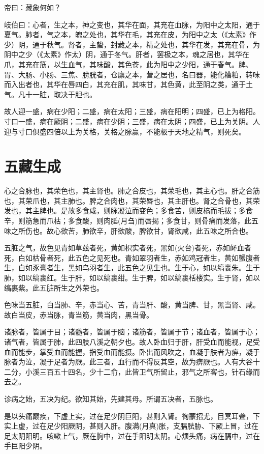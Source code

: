 \documentclass{article}%
\begin{document}
帝曰：藏象何如？

岐伯曰：心者，生之本，神之变也，其华在面，其充在血脉，为阳中之太阳，通于夏气。肺者，气之本，魄之处也，其华在毛，其充在皮，为阳中之太（《太素》作少）阴，通于秋气。肾者，主蛰，封藏之本，精之处也，其华在发，其充在骨，为阴中之少（《太素》作太）阴，通于冬气。肝者，罢极之本，魂之居也，其华在爪，其充在筋，以生血气，其味酸，其色苍，此为阳中之少阳，通于春气。脾、胃、大肠、小肠、三焦、膀胱者，仓廪之本，营之居也，名曰器，能化糟粕，转味而入出者也，其华在唇四白，其充在肌，其味甘，其色黄，此至阴之类，通于土气。凡十一脏，取决于胆也。

故人迎一盛，病在少阳；二盛，病在太阳；三盛，病在阳明；四盛，已上为格阳。寸口一盛，病在厥阴；二盛，病在少阴；三盛，病在太阴；四盛，已上为关阴。人迎与寸口俱盛四倍以上为关格，关格之脉赢，不能极于天地之精气，则死矣。
\section{五藏生成}
心之合脉也，其荣色也，其主肾也。肺之合皮也，其荣毛也，其主心也。肝之合筋也，其荣爪也，其主肺也。脾之合肉也，其荣唇也，其主肝也。肾之合骨也，其荣发也，其主脾也。是故多食咸，则脉凝泣而变色；多食苦，则皮槁而毛拔；多食辛，则筋急而爪枯；多食酸，则肉胝(月刍)而唇揭；多食甘，则骨痛而发落，此五味之所伤也。故心欲苦，肺欲辛，肝欲酸，脾欲甘，肾欲咸，此五味之所合也。

五脏之气，故色见青如草兹者死，黄如枳实者死，黑如(火台)者死，赤如衃血者死，白如枯骨者死，此五色之见死也。青如翠羽者生，赤如鸡冠者生，黄如蟹腹者生，白如豕膏者生，黑如乌羽者生，此五色之见生也。生于心，如以缟裹朱。生于肺，如以缟裹红。生于肝，如以缟裹绀。生于脾，如以缟裹栝楼实。生于肾，如以缟裹紫。此五脏所生之外荣也。

色味当五脏，白当肺、辛，赤当心、苦，青当肝、酸，黄当脾、甘，黑当肾、咸。故白当皮，赤当脉，青当筋，黄当肉，黑当骨。

诸脉者，皆属于目；诸髓者，皆属于脑；诸筋者，皆属于节；诸血者，皆属于心；诸气者，皆属于肺，此四肢八溪之朝夕也。故人卧血归于肝，肝受血而能视，足受血而能步，掌受血而能握，指受血而能摄。卧出而风吹之，血凝于肤者为痹，凝于脉者为泣，凝于足者为厥。此三者，血行而不得反其空，故为痹厥也。人有大谷十二分，小溪三百五十四名，少十二俞，此皆卫气所留止，邪气之所客也，针石缘而去之。

诊病之始，五决为纪。欲知其始，先建其母。所谓五决者，五脉也。

是以头痛巅疾，下虚上实，过在足少阴巨阳，甚则入肾。徇蒙招尤，目冥耳聋，下实上虚，过在足少阳厥阴，甚则入肝。腹满(月真)胀，支膈胠胁、下厥上冒，过在足太阴阳明。咳嗽上气，厥在胸中，过在手阳明太阴。心烦头痛，病在膈中，过在手巨阳少阴。
\end{document}
